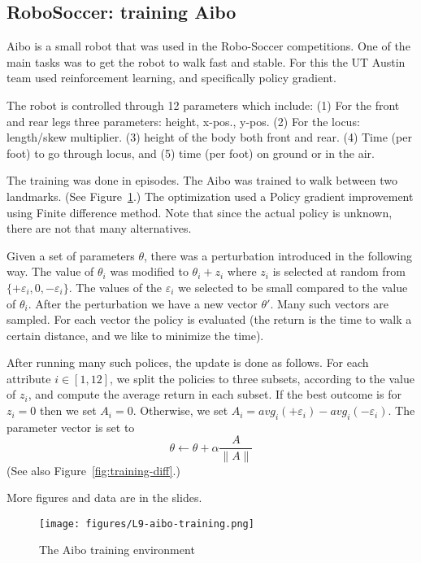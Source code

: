 \subsection{RoboSoccer: training Aibo}

Aibo is a small robot that was used in the Robo-Soccer competitions.
One of the main tasks was to get the robot to walk fast and stable.
For this the UT Austin team used reinforcement learning, and
specifically policy gradient.

The robot is controlled through 12 parameters which include: (1) For
the front and rear legs three parameters: height, x-pos., y-pos. (2)
For the locus:  length/skew multiplier. (3) height of the body both
front and rear. (4) Time (per foot) to go through locus, and (5)
time (per foot) on ground or in the air.

The training was done in episodes. The Aibo was trained to walk
between two landmarks. (See Figure~\ref{fig:aibo-training}.) The
optimization used a Policy gradient improvement using Finite
difference method. Note that since the actual policy is unknown,
there are not that many alternatives.

Given a set of parameters $\theta$, there was a perturbation
introduced in the following way. The value of $\theta_i$ was
modified to $\theta_i+z_i$ where $z_i$ is selected at random from
$\{+\varepsilon_i,0,-\varepsilon_i\}$. The values of the
$\varepsilon_i$ we selected to be small compared to the value of
$\theta_i$. After the perturbation we have a new vector $\theta'$.
Many such vectors are sampled. For each vector the policy is
evaluated (the return is the time to walk a certain distance, and we
like to minimize the time).

After running many such polices, the update is done as follows. For
each attribute $i\in[1,12]$, we split the policies to three subsets,
according to the value of $z_i$, and compute the average return in
each subset. If the best outcome is for $z_i=0$ then we set $A_i=0$.
Otherwise, we set $A_i=
avg_i(+\varepsilon_i)-avg_i(-\varepsilon_i)$. The parameter vector
is set to
\[
\theta \leftarrow \theta +\alpha \frac{A}{\|A\|}
\]
(See also Figure~\ref{fig:training-diff}.)

More figures and data are in the slides.



\begin{figure}
  \begin{centering}
\texttt{[image: figures/L9-aibo-training.png]}\\
  \caption{The Aibo training environment }\label{fig:aibo-training}
  \end{centering}
\end{figure}


